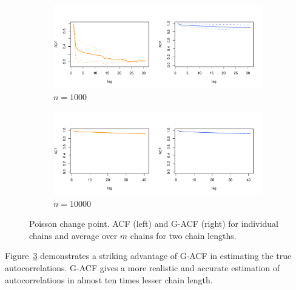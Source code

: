 \documentclass[11pt]{article}
\theoremstyle{remark}
\begin{document}
\begin{figure}[h]
    \centering
    \begin{subfigure}[h]{.8\textwidth}
      \centering
      \includegraphics[width = \textwidth]{plots/poisson-acf_n1000.pdf}
      \caption{$n = 1000$}
      \label{subfig:poisson-acf_n1e3}
    \end{subfigure}
    \begin{subfigure}[h]{.8\textwidth}
      \centering
      \includegraphics[width = \textwidth]{plots/poisson-acf_n10000.pdf}
      \caption{$n = 10000$}
      \label{subfig:poisson-acf_n1e4}
    \end{subfigure}
    \caption{Poisson change point. ACF (left) and G-ACF (right) for individual chains and average over $m$ chains for two chain lengths.}
    \label{fig:poisson-acf}
\end{figure}

Figure~\ref{fig:poisson-acf} demonstrates a striking advantage of G-ACF in estimating the true autocorrelations. G-ACF gives a more realistic and accurate estimation of autocorrelations in almost ten times lesser chain length.

\end{document}
